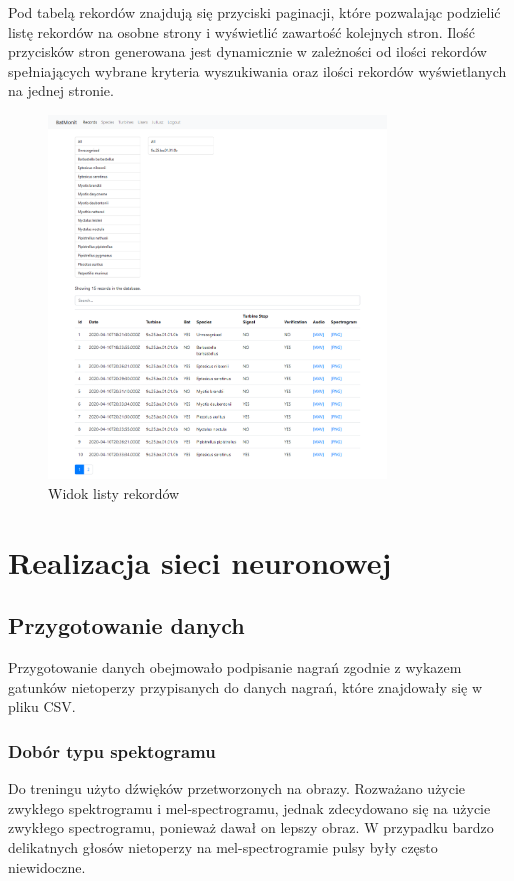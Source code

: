 \documentclass{sprz}
\begin{document}
Pod tabelą rekordów znajdują się przyciski paginacji, które pozwalając podzielić listę rekordów na osobne strony i wyświetlić zawartość kolejnych stron. Ilość przycisków stron generowana jest dynamicznie w zależności od ilości rekordów spełniających wybrane kryteria wyszukiwania oraz ilości rekordów wyświetlanych na jednej stronie.

\begin{figure}[h]
  \centering
  \includegraphics[width=0.8\textwidth]{sprz/app_records}
  \caption{Widok listy rekordów}
  \label{img:app_records}
\end{figure}

\chapter{Realizacja sieci neuronowej}

\section{Przygotowanie danych}
Przygotowanie danych obejmowało podpisanie nagrań zgodnie z wykazem gatunków nietoperzy przypisanych do danych nagrań, które znajdowały się w pliku CSV.

\subsection{Dobór typu spektogramu}
Do treningu użyto dźwięków przetworzonych na obrazy. Rozważano użycie zwykłego spektrogramu i mel-spectrogramu, jednak zdecydowano się na użycie zwykłego spectrogramu, ponieważ dawał on lepszy obraz. W przypadku bardzo delikatnych głosów nietoperzy na mel-spectrogramie pulsy były często niewidoczne.
\end{document}
